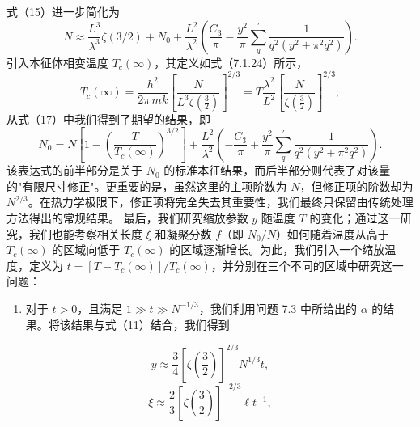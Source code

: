 式（15）进一步简化为
\begin{equation}\tag{17.6.19}\label{eq:17.6.19}
N \approx \frac { L ^{3} } { \lambda ^{3} } \zeta \left( 3 / 2 \right) + N _ { 0 } + \frac { L ^{2} } { \lambda ^{2} } \left( \frac { C _ { 3 } } { \pi } - \frac { y ^{2} } { \pi } \sum _ { q } ^{\prime} \frac { 1 } { q ^{2} \left( y ^{2} + \pi ^{2} q ^{2} \right) } \right) .
\end{equation}
引入本征体相变温度 \(T_{c}(\infty)\)，其定义如式（7.1.24）所示，
\begin{equation}\tag{17.6.20}\label{eq:17.6.20}
T _ { c } ( \infty ) = \frac { h ^{2} } { 2 \pi \, m k } \left[ \frac { N } { L ^{3} \zeta \left( \frac { 3 } { 2 } \right) } \right] ^{2 / 3} = T \frac { \lambda ^{2} } { L ^{2} } \left[ \frac { N } { \zeta \left( \frac { 3 } { 2 } \right) } \right] ^{2 / 3} ;
\end{equation}
从式（17）中我们得到了期望的结果，即
\begin{equation}\tag{17.6.21}\label{eq:17.6.21}
N _ { 0 } = N \left[ 1 - \left( \frac { T } { T _ { c } ( \infty ) } \right) ^{3 / 2} \right] + \frac { L ^{2} } { \lambda ^{2} } \left( - \frac { C _ { 3 } } { \pi } + \frac { y ^{2} } { \pi } \sum _ { q } ^{\prime} \frac { 1 } { q ^{2} \left( y ^{2} + \pi ^{2} q ^{2} \right) } \right) .
\end{equation}
该表达式的前半部分是关于 \(N_{0}\) 的标准本征结果，而后半部分则代表了对该量的"有限尺寸修正"。更重要的是，虽然这里的主项阶数为 \(N\)，但修正项的阶数却为 \(N^{2/3}\)。在热力学极限下，修正项将完全失去其重要性，我们最终只保留由传统处理方法得出的常规结果。
最后，我们研究缩放参数 \(y\) 随温度 \(T\) 的变化；通过这一研究，我们也能考察相关长度 \(\xi\) 和凝聚分数 \(f\)（即 \(N_0/N\)）如何随着温度从高于 \(T_c(\infty)\) 的区域向低于 \(T_c(\infty)\) 的区域逐渐增长。为此，我们引入一个缩放温度，定义为 \(t=[T-T_c(\infty)]/T_c(\infty)\)，并分别在三个不同的区域中研究这一问题：
\begin{enumerate}
\def\labelenumi{(\alph{enumi})}
\item
  对于 \(t > 0\)，且满足 \(1 \gg t \gg N^{-1/3}\)，我们利用问题 7.3 中所给出的 \(\alpha\) 的结果。将该结果与式（11）结合，我们得到
\end{enumerate}
\begin{equation}\tag{17.6.22}\label{eq:17.6.22}
y \approx \frac { 3 } { 4 } \left[ \zeta \left( \frac { 3 } { 2 } \right) \right] ^{2 / 3} N ^{1 / 3} t ,
\end{equation}
\begin{equation}\tag{17.6.23}\label{eq:17.6.23}
\xi \approx \frac { 2 } { 3 } \left[ \zeta \left( \frac { 3 } { 2 } \right) \right] ^{- 2 / 3} \ell t ^{- 1} ,
\end{equation}
